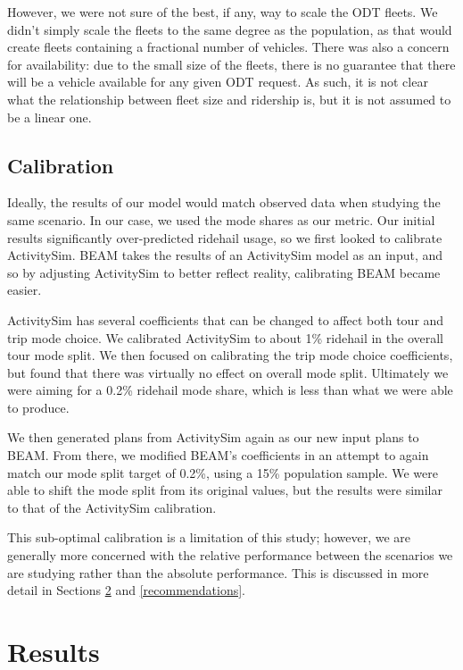 \documentclass[
]{report}
\begin{document}
However, we were not sure of the best, if any, way to scale the ODT fleets. We didn't simply scale the fleets to the same degree as the population, as that would create fleets containing a fractional number of vehicles. There was also a concern for availability: due to the small size of the fleets, there is no guarantee that there will be a vehicle available for any given ODT request. As such, it is not clear what the relationship between fleet size and ridership is, but it is not assumed to be a linear one.

\hypertarget{scenario-calibration}{%
\section{Calibration}\label{scenario-calibration}}

Ideally, the results of our model would match observed data when studying the same scenario. In our case, we used the mode shares as our metric. Our initial results significantly over-predicted ridehail usage, so we first looked to calibrate ActivitySim. BEAM takes the results of an ActivitySim model as an input, and so by adjusting ActivitySim to better reflect reality, calibrating BEAM became easier.

ActivitySim has several coefficients that can be changed to affect both tour and trip mode choice. We calibrated ActivitySim to about 1\% ridehail in the overall tour mode split. We then focused on calibrating the trip mode choice coefficients, but found that there was virtually no effect on overall mode split. Ultimately we were aiming for a 0.2\% ridehail mode share, which is less than what we were able to produce.

We then generated plans from ActivitySim again as our new input plans to BEAM. From there, we modified BEAM's coefficients in an attempt to again match our mode split target of 0.2\%, using a 15\% population sample. We were able to shift the mode split from its original values, but the results were similar to that of the ActivitySim calibration.

This sub-optimal calibration is a limitation of this study; however, we are generally more concerned with the relative performance between the scenarios we are studying rather than the absolute performance. This is discussed in more detail in Sections \ref{results} and \ref{recommendations}.

\hypertarget{results}{%
\chapter{Results}\label{results}}
\end{document}
